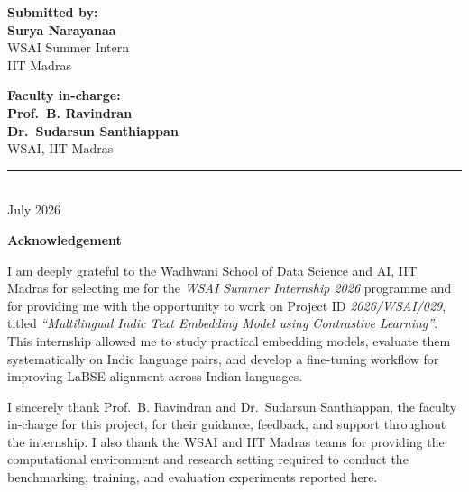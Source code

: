 \documentclass[12pt, a4paper]{article}
\begin{document}
\begin{titlepage}
  \vspace{1.25cm}

  \begin{minipage}[t]{0.45\textwidth}
    \raggedright
    \textbf{Submitted by:}\\[0.4em]
    {\large\bfseries Surya Narayanaa}\\[0.3em]
    WSAI Summer Intern\\
    IIT Madras
  \end{minipage}
  \hfill
  \begin{minipage}[t]{0.47\textwidth}
    \raggedleft
    \textbf{Faculty in-charge:}\\[0.4em]
    {\large\bfseries Prof.\ B. Ravindran}\\[0.2em]
    {\large\bfseries Dr.\ Sudarsun Santhiappan}\\[0.3em]
    WSAI, IIT Madras
  \end{minipage}

  \vfill
  \rule{0.78\textwidth}{0.5pt}\\[0.4cm]
  {\large July 2026}
\end{titlepage}

\newpage
\thispagestyle{fancy}

\vspace*{0.18\textheight}

\begin{center}
{\Large\bfseries Acknowledgement}
\end{center}

\vspace{1cm}

I am deeply grateful to the Wadhwani School of Data Science and AI, IIT Madras for selecting me for the \textit{WSAI Summer Internship 2026} programme and for providing me with the opportunity to work on Project ID \textit{2026/WSAI/029}, titled \textit{``Multilingual Indic Text Embedding Model using Contrastive Learning''}. This internship allowed me to study practical embedding models, evaluate them systematically on Indic language pairs, and develop a fine-tuning workflow for improving LaBSE alignment across Indian languages.

\vspace{0.5em}

I sincerely thank Prof.\ B. Ravindran and Dr.\ Sudarsun Santhiappan, the faculty in-charge for this project, for their guidance, feedback, and support throughout the internship. I also thank the WSAI and IIT Madras teams for providing the computational environment and research setting required to conduct the benchmarking, training, and evaluation experiments reported here.
\end{document}
